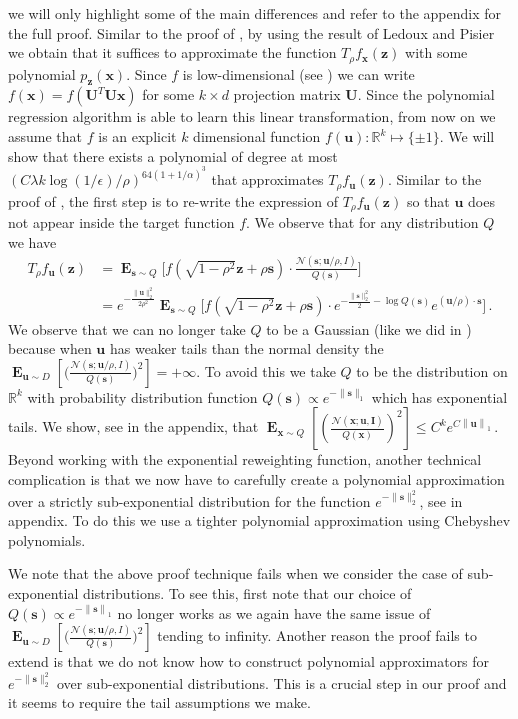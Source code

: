 \documentclass{theoretics}
\newcommand\twonorm[1]{\|#1\|_2}
\newcommand\norm[1]{\left\| #1 \right\|}
\renewcommand\vec[1]{\mathbf{#1}}
\DeclareMathOperator*{\E}{\mathbf{E}}
\newcommand{\R}{\mathbb{R}}
\newcommand{\1}{\Ind}
\newcommand{\x}{\vec x}
\newcommand{\vu}{\vec u}
\newcommand{\z}{\vec z}
\newcommand{\Gauss}{\mathcal{N}}
\begin{document}
we will only highlight some of the main differences and refer to the appendix for the 
full proof. Similar to the proof of , by using the result of 
Ledoux and Pisier  we obtain that it suffices to approximate the function 
$T_\rho f_\x(\z)$ with some polynomial $p_\z(\x)$.  Since $f$ is low-dimensional (see ) we can write $f(\x) = f(\vec U^T \vec U \x)$ for some $k \times d$ 
projection matrix $\vec U$. Since the polynomial regression algorithm is able to learn this linear
transformation, from now on we assume that $f$ is an explicit $k$ dimensional function 
$f(\vu):\R^k \mapsto \{\pm 1\}$.  We will show that there exists a polynomial of degree 
at most $\left(C\lambda k\log (1/\epsilon)/\rho\right)^{64(1+1/\alpha)^3}$ that approximates 
$T_\rho f_\vu(\z)$. Similar to the proof of , 
the first step is to re-write the expression of $T_\rho f_\vu(\z)$ so that $\vu$ does not appear inside the target function $f$.  We observe that for any distribution $Q$ we have
    \begin{align*}
        T_{\rho}f_{\vu}(\z) &=\E_{\vec s\sim Q}\biggl[f(\sqrt{1-\rho^2}\z+\rho\vec s)\cdot \frac{\Gauss(\vec s;\vu/\rho,I)}{Q(\vec s)}\biggr]\\
        &=e^{-\frac{\twonorm{\vu}^2}{2\rho^2}}\E_{\vec s\sim Q}\biggl[f(\sqrt{1-\rho^2}\z+\rho\vec s)\cdot e^{-\frac{\twonorm{\vec s}^2}{2}-\log Q(\vec s)}e^{ (\vu/\rho)\cdot\vec s}\biggr] \,.
    \end{align*}
    We observe that we can no longer take $Q$ to be a Gaussian (like we did in ) because when $\vec u$ has weaker tails than the normal 
    density the 
    $\E_{\vec u\sim D}[\big(\frac{\Gauss(\vec s;\vu/\rho,I)}{Q(\vec s)} \big)^2] = +\infty$.
    To avoid this we take $Q$ to be the distribution on $\R^k$ with probability distribution 
    function $Q(\vec s)\propto e^{-\|\vec s\|_1}$ which has exponential tails.  We show, see  in the appendix, that
   $ \E_{\x\sim Q}[(\frac{\mathcal{N}(\x; \vu, \vec I)}{Q(\x)})^2] \leq  C^ke^{C\norm{\vu}_1}\,. $
   Beyond working with the exponential reweighting function, another technical complication is that 
   we now have to carefully create a polynomial approximation over a strictly sub-exponential 
   distribution for the function $e^{-\|\vec s\|_2^2}$, see  in appendix.  To do this we use a tighter polynomial approximation using Chebyshev polynomials.
\begin{remark}
\label{rem:tail_assumption}
    We note that the above proof technique fails when we consider the case of sub-exponential distributions. To see this, first note that our choice of $Q(\vec{s})\propto e^{-\norm{\vec{s}}_1}$ no longer works as we again have the same issue of $\E_{\vec u\sim D}[\big(\frac{\Gauss(\vec s;\vu/\rho,I)}{Q(\vec s)} \big)^2]$ tending to infinity. Another reason the proof fails to extend is that we do not know how to construct polynomial approximators for $e^{-\twonorm{\vec{s}}^2}$ over sub-exponential distributions. This is a crucial step in our proof and it seems to require the tail assumptions we make.
\end{remark}
\end{document}
